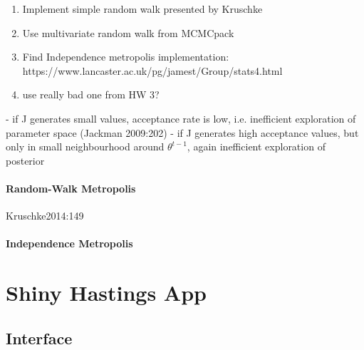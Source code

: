 \documentclass[11pt]{article}
\begin{document}


\begin{enumerate}
\item Implement simple random walk presented by Kruschke
\item Use multivariate random walk from MCMCpack
\item Find Independence metropolis implementation: https://www.lancaster.ac.uk/pg/jamest/Group/stats4.html
\item use really bad one from HW 3?
\end{enumerate}






- if J generates small values, acceptance rate is low, i.e. inefficient exploration of parameter space (Jackman 2009:202)
- if J generates high acceptance values, but only in small neighbourhood around $\theta^{t-1}$, again inefficient exploration of posterior

\paragraph{Random-Walk Metropolis}\label{sec:random}

Kruschke2014:149


\paragraph{Independence Metropolis}\label{sec:independence}














\section{Shiny Hastings App}\label{sec:shiny}


\subsection{Interface}
\end{document}
